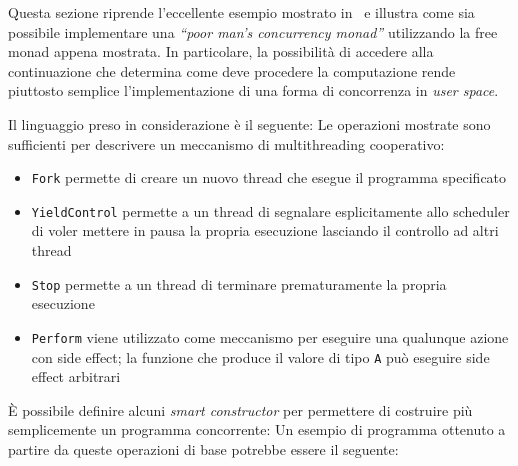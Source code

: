 Questa sezione riprende l'eccellente esempio mostrato in~\cite{cit:a-poor-mans-concurrency-monad} e illustra come sia possibile implementare una \emph{``poor man's concurrency monad''} utilizzando la free monad appena mostrata.
In particolare, la possibilità di accedere alla continuazione che determina come deve procedere la computazione rende piuttosto semplice l'implementazione di una forma di concorrenza in \emph{user space}.

Il linguaggio preso in considerazione è il seguente:
Le operazioni mostrate sono sufficienti per descrivere un meccanismo di multithreading cooperativo:
\begin{itemize}
  \item \lstinline{Fork} permette di creare un nuovo thread che esegue il programma specificato
  \item \lstinline{YieldControl} permette a un thread di segnalare esplicitamente allo scheduler di voler mettere in pausa la propria esecuzione lasciando il controllo ad altri thread
  \item \lstinline{Stop} permette a un thread di terminare prematuramente la propria esecuzione
  \item \lstinline{Perform} viene utilizzato come meccanismo per eseguire una qualunque azione con side effect; la funzione che produce il valore di tipo \lstinline{A} può eseguire side effect arbitrari
\end{itemize}

È possibile definire alcuni \emph{smart constructor} per permettere di costruire più semplicemente un programma concorrente:
Un esempio di programma ottenuto a partire da queste operazioni di base potrebbe essere il seguente:

